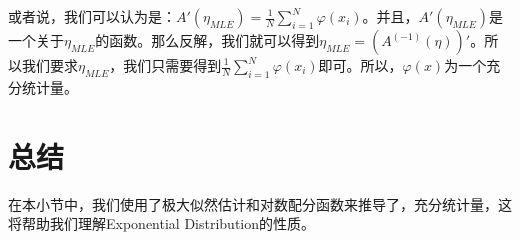 \documentclass[a4paper]{article}
\begin{document}
或者说，我们可以认为是：$A'(\eta_{MLE}) = \frac{1}{N}\sum_{i=1}^N\varphi(x_i)$。并且，$A'(\eta_{MLE})$是一个关于$\eta_{MLE}$的函数。那么反解，我们就可以得到$\eta_{MLE}=(A^{(-1)}(\eta))'$。所以我们要求$\eta_{MLE}$，我们只需要得到$\frac{1}{N}\sum_{i=1}^N\varphi(x_i)$即可。所以，$\varphi(x)$为一个充分统计量。

\section{总结}
在本小节中，我们使用了极大似然估计和对数配分函数来推导了，充分统计量，这将帮助我们理解Exponential Distribution的性质。 
\end{document}
